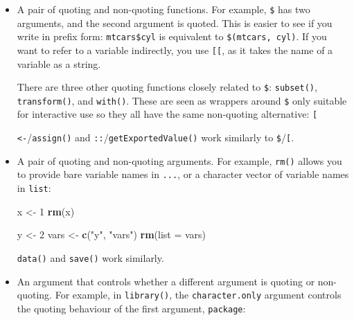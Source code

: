 \documentclass[]{book}
\makeatletter
\newenvironment{Shaded}{\begin{snugshade}}{\end{snugshade}}
\newcommand{\CommentTok}[1]{\textcolor[rgb]{0.37,0.37,0.37}{\textit{#1}}}
\newcommand{\DataTypeTok}[1]{\textcolor[rgb]{0.27,0.27,0.27}{#1}}
\newcommand{\DecValTok}[1]{\textcolor[rgb]{0.06,0.06,0.06}{#1}}
\newcommand{\KeywordTok}[1]{\textcolor[rgb]{0.27,0.27,0.27}{\textbf{#1}}}
\newcommand{\NormalTok}[1]{#1}
\newcommand{\OperatorTok}[1]{\textcolor[rgb]{0.43,0.43,0.43}{\textbf{#1}}}
\newcommand{\StringTok}[1]{\textcolor[rgb]{0.5,0.5,0.5}{#1}}
\newcommand{\indexc}[1]{\index{#1@\texttt{#1}}}
\makeatother
\begin{document}
\begin{itemize}
\item
  A pair of quoting and non-quoting functions. For example, \texttt{\$} has two
  arguments, and the second argument is quoted. This is easier to see if you
  write in prefix form: \texttt{mtcars\$cyl} is equivalent to \texttt{\textasciigrave{}\$\textasciigrave{}(mtcars,\ cyl)}.
  If you want to refer to a variable indirectly, you use \texttt{{[}{[}}, as it
  takes the name of a variable as a string.

\begin{Shaded}
\end{Shaded}

  There are three other quoting functions closely related to \texttt{\$}: \texttt{subset()},
  \texttt{transform()}, and \texttt{with()}. These are seen as wrappers around \texttt{\$} only
  suitable for interactive use so they all have the same non-quoting
  alternative: \texttt{{[}}

  \texttt{\textless{}-}/\texttt{assign()} and \texttt{::}/\texttt{getExportedValue()} work similarly to \texttt{\$}/\texttt{{[}}.
  \indexc{\$}
  \indexc{<-}
\item
  A pair of quoting and non-quoting arguments. For example, \texttt{rm()} allows
  you to provide bare variable names in \texttt{...}, or a character vector of
  variable names in \texttt{list}:

\begin{Shaded}
\begin{Highlighting}[]
\NormalTok{x <-}\StringTok{ }\DecValTok{1}
\KeywordTok{rm}\NormalTok{(x)}

\NormalTok{y <-}\StringTok{ }\DecValTok{2}
\NormalTok{vars <-}\StringTok{ }\KeywordTok{c}\NormalTok{(}\StringTok{"y"}\NormalTok{, }\StringTok{"vars"}\NormalTok{)}
\KeywordTok{rm}\NormalTok{(}\DataTypeTok{list =}\NormalTok{ vars)}
\end{Highlighting}
\end{Shaded}

  \texttt{data()} and \texttt{save()} work similarly.
  \indexc{rm()}
\item
  An argument that controls whether a different argument is quoting or
  non-quoting. For example, in \texttt{library()}, the \texttt{character.only} argument
  controls the quoting behaviour of the first argument, \texttt{package}:


\end{itemize}
\end{document}

